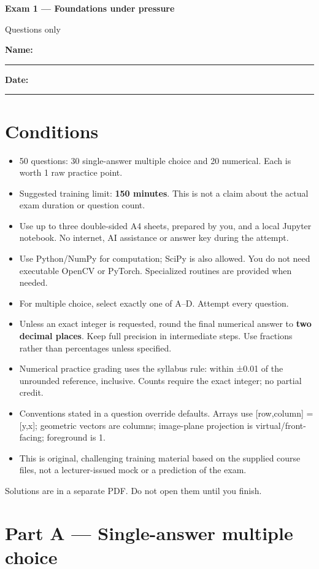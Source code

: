 \documentclass[11pt,a4paper]{article}
\begin{document}
{\LARGE\bfseries Exam 1 — Foundations under pressure}\par
{\large Questions only}\par\bigskip
\textbf{Name:} \rule{70mm}{0.4pt}\hfill \textbf{Date:} \rule{30mm}{0.4pt}
\section*{Conditions}
\begin{itemize}[leftmargin=5mm,itemsep=5pt]
\item 50 questions: 30 single-answer multiple choice and 20 numerical. Each is worth 1 raw practice point.
\item Suggested training limit: \textbf{150 minutes}. This is not a claim about the actual exam duration or question count.
\item Use up to three double-sided A4 sheets,\allowbreak{} prepared by you,\allowbreak{} and a local Jupyter notebook. No internet,\allowbreak{} AI assistance or answer key during the attempt.
\item Use Python/\allowbreak{}NumPy for computation; SciPy is also allowed. You do not need executable OpenCV or PyTorch. Specialized routines are provided when needed.
\item For multiple choice,\allowbreak{} select exactly one of A–D. Attempt every question.
\item Unless an exact integer is requested,\allowbreak{} round the final numerical answer to \textbf{two decimal places}. Keep full precision in intermediate steps. Use fractions rather than percentages unless specified.
\item Numerical practice grading uses the syllabus rule: within ±0.01 of the unrounded reference,\allowbreak{} inclusive. Counts require the exact integer; no partial credit.
\item Conventions stated in a question override defaults. Arrays use [row,\allowbreak{}column] =\allowbreak{} [y,\allowbreak{}x]; geometric vectors are columns; image-plane projection is virtual/\allowbreak{}front-facing; foreground is 1.
\item This is original,\allowbreak{} challenging training material based on the supplied course files,\allowbreak{} not a lecturer-issued mock or a prediction of the exam.
\end{itemize}
Solutions are in a separate PDF. Do not open them until you finish.
\clearpage\section*{Part A — Single-answer multiple choice}
\end{document}
